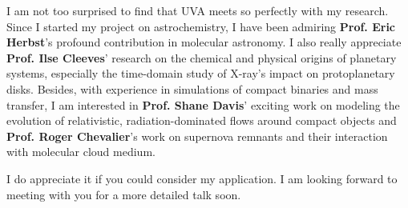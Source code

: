 \documentclass[12pt, a4paper]{awesome-cv} %
\begin{document}
\begin{cvletter}
I am not too surprised to find that UVA meets so perfectly with my research. Since I started my project on astrochemistry, I have been admiring \textbf{Prof. Eric Herbst}’s profound contribution in molecular astronomy. I also really appreciate \textbf{Prof. Ilse Cleeves}’ research on the chemical and physical origins of planetary systems, especially the time-domain study of X-ray’s impact on protoplanetary disks. Besides, with experience in simulations of compact binaries and mass transfer, I am interested in \textbf{Prof. Shane Davis}’ exciting work on modeling the evolution of relativistic, radiation-dominated flows around compact objects and \textbf{Prof. Roger Chevalier}'s work on supernova remnants and their interaction with molecular cloud medium.

I do appreciate it if you could consider my application. I am looking forward to meeting with you for a more detailed talk soon.

\end{cvletter}


\end{document}

